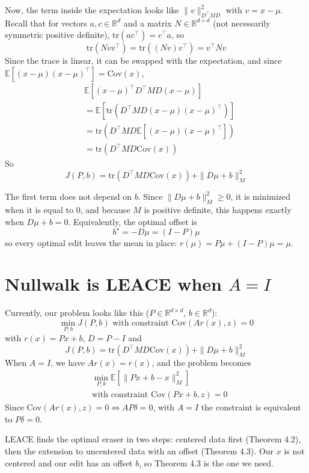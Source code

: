 \documentclass[10pt,a4paper,twocolumn]{article}
\newcommand{\R}{\mathbb{R}}
\begin{document}
	Now, the term inside the expectation looks like $\| v \|_{D^\top M D}^2$ with $v = x - \mu$. Recall that for vectors $a, c \in \R^d$ and a matrix $N \in \R^{d \times d}$ (not necessarily symmetric positive definite), $\mathrm{tr}(a c^\top) = c^\top a$, so
	$$\mathrm{tr}(N v v^\top) = \mathrm{tr}((N v) v^\top) = v^\top N v$$
	Since the trace is linear, it can be swapped with the expectation, and since $\mathbb{E}[(x - \mu)(x - \mu)^\top] = \mathrm{Cov}(x)$,
	$$\begin{aligned}
		& \mathbb{E} \left[ (x - \mu)^\top D^\top M D (x - \mu) \right] \\
		& = \mathbb{E} \left[ \mathrm{tr} \left( D^\top M D (x - \mu)(x - \mu)^\top \right) \right] \\
		& = \mathrm{tr} \left( D^\top M D \mathbb{E} \left[ (x - \mu)(x - \mu)^\top \right] \right) \\
		& = \mathrm{tr} \left( D^\top M D \mathrm{Cov}(x) \right)
	\end{aligned}$$
	So
	$$J(P, b) = \mathrm{tr} \left( D^\top M D \mathrm{Cov}(x) \right) + \| D \mu + b \|_M^2$$

	The first term does not depend on $b$. Since $\| D \mu + b \|_M^2 \ge 0$, it is minimized when it is equal to $0$, and because $M$ is positive definite, this happens exactly when $D \mu + b = 0$. Equivalently, the optimal offset is
	$$b^\star = - D \mu = (I - P) \mu$$
	so every optimal edit leaves the mean in place: $r(\mu) = P \mu + (I - P) \mu = \mu$.

	\section{Nullwalk is LEACE when $A = I$}

	Currently, our problem looks like this ($P \in \R^{d \times d}$, $b \in \R^d$):
	$$\min_{P, b} J(P, b) \text{ with constraint } \mathrm{Cov}(A r(x), z) = 0$$
	with $r(x) = P x + b$, $D = P - I$ and
	$$J(P, b) = \mathrm{tr} \left( D^\top M D \mathrm{Cov}(x) \right) + \| D \mu + b \|_M^2$$
	When $A = I$, we have $A r(x) = r(x)$, and the problem becomes
	$$\begin{aligned}
		& \min_{P, b} \mathbb{E} \left[ \| P x + b - x \|_M^2 \right] \\
		& \text{with constraint } \mathrm{Cov}(P x + b, z) = 0
	\end{aligned}$$
	Since $\mathrm{Cov}(A r(x), z) = 0 \iff A P \delta = 0$, with $A = I$ the constraint is equivalent to $P \delta = 0$.

	LEACE finds the optimal eraser in two steps: centered data first (Theorem 4.2), then the extension to uncentered data with an offset (Theorem 4.3). Our $x$ is not centered and our edit has an offset $b$, so Theorem 4.3 is the one we need.
\end{document}
